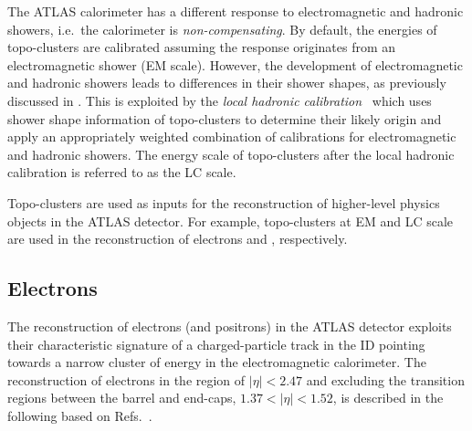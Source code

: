 The ATLAS calorimeter has a different response to electromagnetic and hadronic
showers, i.e.\ the calorimeter is \emph{non-compensating}. By default, the
energies of topo-clusters are calibrated assuming the response originates from
an electromagnetic shower (EM scale). However, the development of
electromagnetic and hadronic showers leads to differences in their shower
shapes, as previously discussed in . This is
exploited by the \emph{local hadronic calibration}~\cite{PERF-2014-07} which
uses shower shape information of topo-clusters to determine their likely origin
and apply an appropriately weighted combination of calibrations for
electromagnetic and hadronic showers. The energy scale of topo-clusters after
the local hadronic calibration is referred to as the LC scale.

Topo-clusters are used as inputs for the reconstruction of higher-level physics
objects in the ATLAS detector. For example, topo-clusters at EM and LC scale are
used in the reconstruction of electrons and \tauhadvis, respectively.


\subsection{Electrons}%
\label{sec:ele_rec}

The reconstruction of electrons (and positrons) in the ATLAS detector exploits
their characteristic signature of a charged-particle track in the ID pointing
towards a narrow cluster of energy in the electromagnetic calorimeter. The
reconstruction of electrons in the region of $|\eta| < 2.47$ and excluding the
transition regions between the barrel and end-caps, $1.37 < |\eta| < 1.52$, is
described in the following based on
Refs.~\cite{ATL-PHYS-PUB-2017-022,EGAM-2018-01}.


